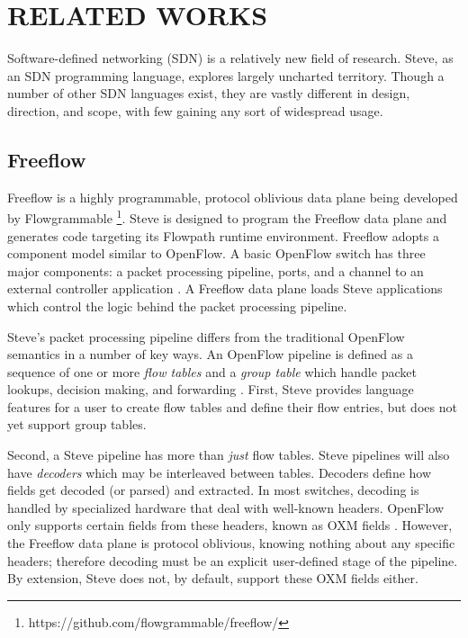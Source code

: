 \chapter{RELATED WORKS} \label{ch:related}

Software-defined networking (SDN) is a relatively new field of research. Steve,
as an SDN programming language, explores largely uncharted territory. Though a
number of other SDN languages exist, they are vastly different in design,
direction, and scope, with few gaining any sort of widespread usage. 

\section{Freeflow} \label{rel:freeflow}

Freeflow is a highly programmable, protocol oblivious data plane being developed
by Flowgrammable \footnote{https://github.com/flowgrammable/freeflow/}. Steve is
designed to program the Freeflow data plane and generates code targeting its
Flowpath runtime environment.
Freeflow adopts a component model similar to OpenFlow. A basic OpenFlow switch
has three major components: a packet processing pipeline, ports, and a channel
to an external controller application \cite{openflow_spec}. A Freeflow data
plane loads Steve applications which control the logic behind the packet
processing pipeline.

Steve's packet processing pipeline differs from the traditional OpenFlow
semantics in a number of key ways. An OpenFlow pipeline is defined as a sequence
of one or more \textit{flow tables} and a \textit{group table} which handle
packet lookups, decision making, and forwarding \cite{openflow_spec}. First,
Steve provides language features for a user to create flow tables and define
their flow entries, but does not yet support group tables. 

Second, a Steve pipeline has more than \textit{just} flow tables. Steve
pipelines will also have \textit{decoders} which may be interleaved between
tables. Decoders define how fields get decoded (or parsed) and extracted. In
most switches, decoding is handled by specialized hardware that deal with
well-known headers. OpenFlow only supports certain fields from these headers,
known as OXM fields \cite{openflow_spec}. However, the Freeflow data plane is
protocol oblivious, knowing nothing about any specific headers; therefore
decoding must be an explicit user-defined stage of the pipeline. By extension,
Steve does not, by default, support these OXM fields either.

